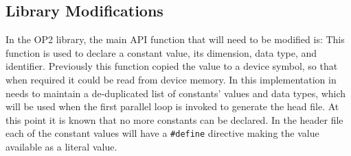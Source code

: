 \subsection{Library Modifications}
In the OP2 library, the main API function that will need to be modified is:
\noindent This function is used to declare a constant value, its dimension, data type, and identifier.
Previously this function copied the value to a device symbol, so that when required it could be read from device memory. In this implementation in needs to maintain a de-duplicated list of constants' values and data types, which will be used when the first parallel loop is invoked to generate the head file. At this point it is known that no more constants can be declared. In the header file each of the constant values will have a \verb|#define| directive making the value available as a literal value.
